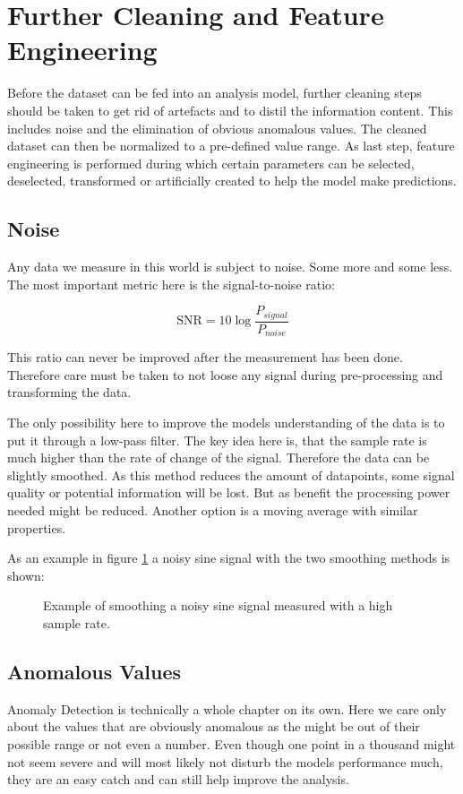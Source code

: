 \section{Further Cleaning and Feature Engineering}
Before the dataset can be fed into an analysis model, further cleaning steps should be taken to get rid of artefacts and to distil the information content. This includes noise and the elimination of obvious anomalous values. The cleaned dataset can then be normalized to a pre-defined value range. As last step, feature engineering is performed during which certain parameters can be selected, deselected, transformed or artificially created to help the model make predictions.

	\subsection{Noise}
	Any data we measure in this world is subject to noise. Some more and some less. The most important metric here is the signal-to-noise ratio:
	
	\begin{equation}
	\text{SNR} = 10\log\frac{P_{signal}}{P_{noise}}
	\end{equation}
	
	This ratio can never be improved after the measurement has been done. Therefore care must be taken to not loose any signal during pre-processing and transforming the data.
	
	The only possibility here to improve the models understanding of the data is to put it through a low-pass filter. The key idea here is, that the sample rate is much higher than the rate of change of the signal. Therefore the data can be slightly smoothed. As this method reduces the amount of datapoints, some signal quality or potential information will be lost. But as benefit the processing power needed might be reduced. \newline
	Another option is a moving average with similar properties. 
	
	As an example in figure \ref{f:noise_example} a noisy sine signal with the two smoothing methods is shown:
	
	\begin{figure}[htb]
	\centering
	
	\caption{Example of smoothing a noisy sine signal measured with a high sample rate.}
	\label{f:noise_example}
	\end{figure}
	
	\subsection{Anomalous Values}
	Anomaly Detection is technically a whole chapter on its own. Here we care only about the values that are obviously anomalous as the might be out of their possible range or not even a number. Even though one point in a thousand might not seem severe and will most likely not disturb the models performance much, they are an easy catch and can still help improve the analysis.
	
